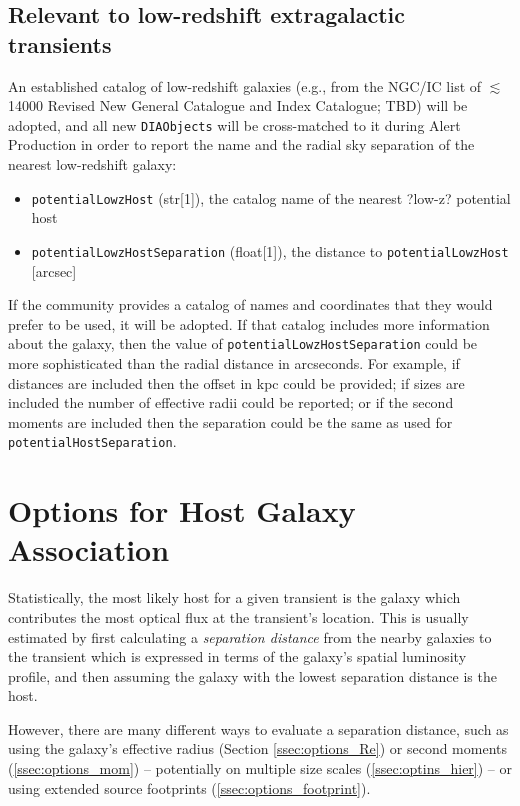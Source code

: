 \documentclass[DM,authoryear,toc]{lsstdoc}
\begin{document}
\subsection{Relevant to low-redshift extragalactic transients}\label{ssec:params_lowz}

An established catalog of low-redshift galaxies (e.g., from the NGC/IC list of $\lesssim$14000 Revised New General Catalogue and Index Catalogue; TBD) will be adopted, and all new {\tt DIAObjects} will be cross-matched to it during Alert Production in order to report the name and the radial sky separation of the nearest low-redshift galaxy:
\begin{itemize}
\item {\tt potentialLowzHost} (str[1]), the catalog name of the nearest ?low-z? potential host
\item {\tt potentialLowzHostSeparation} (float[1]), the distance to {\tt potentialLowzHost} [arcsec]
\end{itemize}

If the community provides a catalog of names and coordinates that they would prefer to be used, it will be adopted. 
If that catalog includes more information about the galaxy, then the value of {\tt potentialLowzHostSeparation} could be more sophisticated than the radial distance in arcseconds. 
For example, if distances are included then the offset in kpc could be provided; if sizes are included the number of effective radii could be reported; or if the second moments are included then the separation could be the same as used for {\tt potentialHostSeparation}. 



\section{Options for Host Galaxy Association}\label{sec:options}

Statistically, the most likely host for a given transient is the galaxy which contributes the most optical flux at the transient's location.
This is usually estimated by first calculating a \emph{separation distance} from the nearby galaxies to the transient which is expressed in terms of the galaxy's spatial luminosity profile, and then assuming the galaxy with the lowest separation distance is the host.

However, there are many different ways to evaluate a separation distance, such as using the galaxy's effective radius (Section \ref{ssec:options_Re}) or second moments (\ref{ssec:options_mom}) -- potentially on multiple size scales (\ref{ssec:optins_hier}) -- or using extended source footprints (\ref{ssec:options_footprint}).
\end{document}
